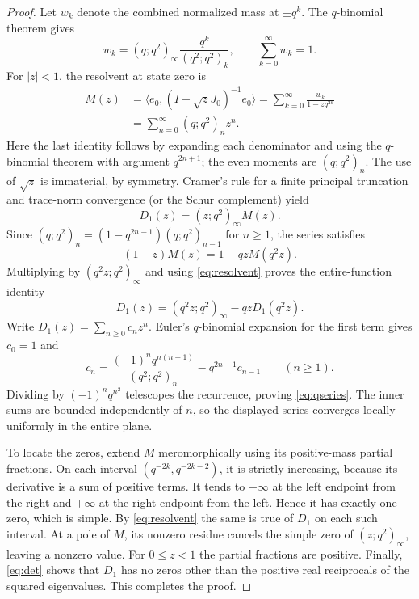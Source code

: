 \documentclass[11pt]{article}
\theoremstyle{definition}\newtheorem{definition}[theorem]{Definition}
\begin{document}
\begin{proof}
Let $w_k$ denote the combined normalized mass at $\pm q^k$. The $q$-binomial theorem \cite[\S17.5]{DLMF} gives
\[
 w_k=(q;q^2)_\infty\frac{q^k}{(q^2;q^2)_k},\qquad
 \sum_{k=0}^{\infty}w_k=1.
\]
For $|z|<1$, the resolvent at state zero is
\begin{align*}
 M(z)&=\langle e_0,(I-\sqrt z J_0)^{-1}e_0\rangle
      =\sum_{k=0}^{\infty}\frac{w_k}{1-zq^{2k}}\\
     &=\sum_{n=0}^{\infty}(q;q^2)_n z^n.
\end{align*}
Here the last identity follows by expanding each denominator and using the $q$-binomial theorem with argument $q^{2n+1}$; the even moments are $(q;q^2)_n$. The use of $\sqrt z$ is immaterial, by symmetry. Cramer's rule for a finite principal truncation and trace-norm convergence (or the Schur complement) yield
\begin{equation}\label{eq:resolvent}
 D_1(z)=(z;q^2)_\infty M(z).
\end{equation}
Since $(q;q^2)_n=(1-q^{2n-1})(q;q^2)_{n-1}$ for $n\geq1$, the series satisfies
\[
 (1-z)M(z)=1-qzM(q^2z).
\]
Multiplying by $(q^2z;q^2)_\infty$ and using \eqref{eq:resolvent} proves the entire-function identity
\begin{equation}\label{eq:functional}
 D_1(z)=(q^2z;q^2)_\infty-qzD_1(q^2z).
\end{equation}
Write $D_1(z)=\sum_{n\geq0}c_nz^n$. Euler's $q$-binomial expansion for the first term gives $c_0=1$ and
\[
 c_n=\frac{(-1)^n q^{n(n+1)}}{(q^2;q^2)_n}-q^{2n-1}c_{n-1}\qquad(n\geq1).
\]
Dividing by $(-1)^nq^{n^2}$ telescopes the recurrence, proving \eqref{eq:qseries}. The inner sums are bounded independently of $n$, so the displayed series converges locally uniformly in the entire plane.

To locate the zeros, extend $M$ meromorphically using its positive-mass partial fractions. On each interval $(q^{-2k},q^{-2k-2})$, it is strictly increasing, because its derivative is a sum of positive terms. It tends to $-\infty$ at the left endpoint from the right and $+\infty$ at the right endpoint from the left. Hence it has exactly one zero, which is simple. By \eqref{eq:resolvent} the same is true of $D_1$ on each such interval. At a pole of $M$, its nonzero residue cancels the simple zero of $(z;q^2)_\infty$, leaving a nonzero value. For $0\leq z<1$ the partial fractions are positive. Finally, \eqref{eq:det} shows that $D_1$ has no zeros other than the positive real reciprocals of the squared eigenvalues. This completes the proof.
\end{proof}
\end{document}
